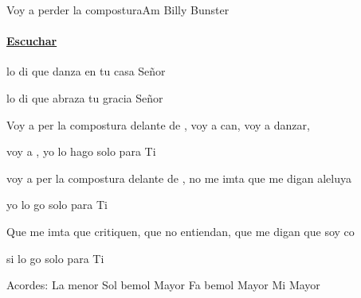 \documentclass[12pt, spanish]{book}
\newcommand{\NotCCLIed}{\relax}
\begin{document}
    \begin{song}{Voy a perder la compostura}{Am}
        {} %
        {Billy Bunster}
        {} %
        {} %
        \ifChordBk
        \paragraph{\mbox{}\hfill\protect\href{https://open.spotify.com/intl-es/track/3ehjdUSI5cKr2gsEbhrj2M}{Escuchar}\mbox{}\hfill}
        \fi



        \begin{SBOpGroup}
             lo di que  danza en tu casa Señor


             lo di que  abraza tu gracia Señor
        \end{SBOpGroup}

        \begin{SBChorus}
            Voy a per la compostura delante de , voy a can, voy a danzar,

            voy a , yo lo hago solo para Ti

            voy a per la compostura delante de , no me imta que me digan aleluya

            yo lo go solo para Ti
        \end{SBChorus}

        \begin{SBOpGroup}
            Que me imta que critiquen, que no entiendan, que me digan que soy co

            si  lo go solo para Ti
        \end{SBOpGroup}

        \ifChordBk
        \begin{SBOpGroup}
            Acordes:\break
            \upchord{\Am}La menor \hfill
            \upchord{\G}\qquad Sol bemol Mayor \hfill\null\break
            \upchord{\F}\qquad Fa bemol Mayor \hfill
            \upchord{\E}\qquad Mi Mayor \hfill\null\break
        \end{SBOpGroup}
        \fi
        \begin{SBExtraKeys}{

}
\end{SBExtraKeys}
\end{song}
\end{document}

